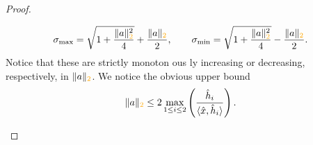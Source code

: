\documentclass[10pt,letterpaper]{article}
\newcommand\cye[1]{%
  \protect\leavevmode
  \begingroup
    \color{red!35!yellow}%
    #1%
  \endgroup
}
\begin{document}
\begin{proof}
\begin{itemize}
        \begin{align*}
            \sigma_{\max} = \sqrt{ 1 + \frac{ \|a\|_{\cye{2}}^{2} }{ 4 } } + \frac{ \|a\|_{\cye{2}} }{2},
            \qquad 
            \sigma_{\min} = \sqrt{ 1 + \frac{ \|a\|_{\cye{2}}^{2} }{ 4 } } - \frac{ \|a\|_{\cye{2}} }{2}.     
        \end{align*}
        Notice that these are strictly monoton\cye{ous}ly increasing or decreasing, respectively, in $\|a\|_{\cye{2}}$.
        We notice the obvious upper bound 
        \begin{align*}
            \|a\|_{\cye{2}} 
            \leq 
            2 \max_{1 \leq i \leq 2} 
            \left( 
                \frac{ \hat h_i }{ \langle \hat x, \hat h_i \rangle } 
            \right)
            .
        \end{align*}


\end{itemize}
\end{proof}
\end{document}
